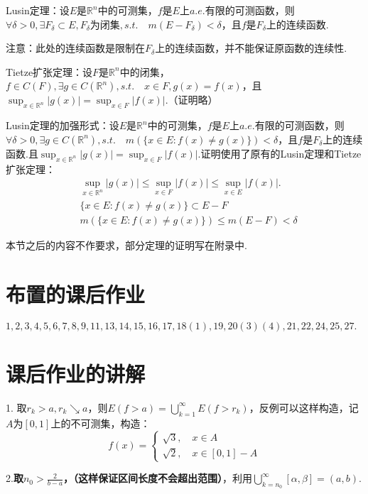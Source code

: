 \documentclass[bwprint, withoutpreface]{cumcmthesis}
\begin{document}
Lusin定理：设$E$是$\mathbb{R}^n$中的可测集，$f$是$E$上$a.e.$有限的可测函数，则$\forall \delta > 0, \exists F_{\delta} \subset E, F_{\delta}\mbox{为闭集}, s.t. \quad m(E - F_{\delta}) < \delta$，且$f$是$F_{\delta}$上的连续函数.

注意：此处的连续函数是限制在$F_{\delta}$上的连续函数，并不能保证原函数的连续性.

Tietze扩张定理：设$F$是$\mathbb{R}^n$中的闭集，$f \in C(F), \exists g \in C(\mathbb{R}^n), s.t. \quad x \in F, g(x) = f(x)$，且$\sup_{x \in \mathbb{R}^n}{|g(x)|} = \sup_{x \in F}{|f(x)|}$.（证明略）

Lusin定理的加强形式：设$E$是$\mathbb{R}^n$中的可测集，$f$是$E$上$a.e.$有限的可测函数，则$\forall \delta > 0, \exists g \in C(\mathbb{R}^n), s.t. \quad m(\{x \in E:f(x) \neq g(x)\}) < \delta$，且$f$是$F_{\delta}$上的连续函数.且$\sup_{x \in \mathbb{R}^n}{|g(x)|} = \sup_{x \in F}{|f(x)|}$.证明使用了原有的Lusin定理和Tietze扩张定理：
\begin{align*}
	& \sup_{x \in \mathbb{R}^n}{|g(x)|} \leqslant \sup_{x \in F}{|f(x)|} \leqslant \sup_{x \in E}{|f(x)|}. \\
	& \{x \in E:f(x) \neq g(x)\} \subset E - F \\
	& m(\{x \in E:f(x) \neq g(x)\}) \leqslant m(E - F) < \delta
\end{align*}

本节之后的内容不作要求，部分定理的证明写在附录中.

\appendix
\section{布置的课后作业}
\indent $1,2,3,4,5,6,7,8,9,11,13,14,15,16,17,18(1),19,20(3)(4),21,22,24,25,27.$

\section{课后作业的讲解}
1. 取$r_k > a, r_k \searrow a$，则$E(f > a) = \bigcup_{k = 1}^{\infty}{E(f > r_k)}$，反例可以这样构造，记$A \mbox{为} [0, 1]$上的不可测集，构造：
\begin{equation*}
	f(x) = 
	\begin{cases}
		\sqrt{3}, \quad x \in A \\
		\sqrt{2}, \quad x \in [0, 1] - A
	\end{cases}
\end{equation*}

2.\textbf{取$n_0 > \frac{2}{b - a}$，（这样保证区间长度不会超出范围）}，利用$\bigcup_{k = n_0}^{\infty}{[\alpha, \beta]} = (a, b)$.
\end{document}

